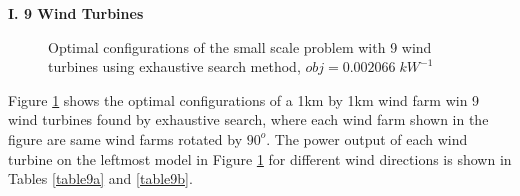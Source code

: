     \textbf{I. 9 Wind Turbines}
        \begin{figure}[H]
            \centering
            \qquad
            \qquad
            \qquad
            \caption{Optimal configurations of the small scale problem with 9 wind turbines using exhaustive search method, $obj=0.002066\;kW^{-1}$}
            \label{small9}
        \end{figure}
        
        Figure \ref{small9} shows the optimal configurations of a 1km by 1km wind farm win 9 wind turbines found by exhaustive search, where each wind farm shown in the figure are same wind farms rotated by $90^o$. The power output of each wind turbine on the leftmost model in Figure \ref{small9} for different wind directions is shown in Tables \ref{table9a} and \ref{table9b}.
        
